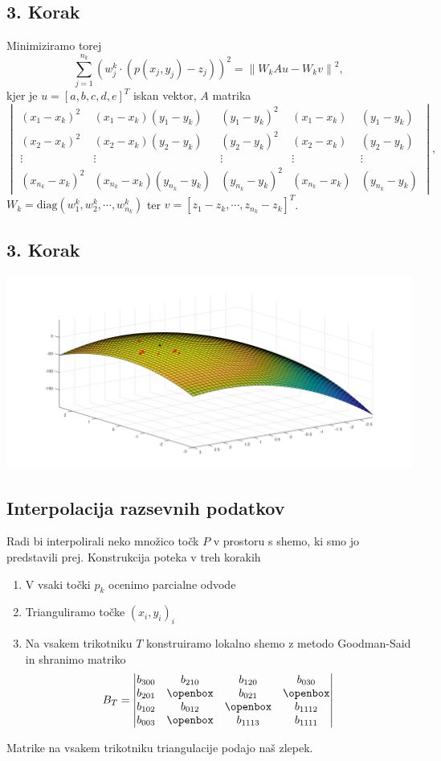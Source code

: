 \documentclass[ignorenonframetext]{beamer}
\newcommand{\norm}[1]{\left\lVert#1\right\rVert}
\let\frametitle\subsection %
\begin{document}
\begin{frame}
\frametitle{3. Korak}
Minimiziramo torej
$$\sum_{j =1}^{n_k} (w^k_j \cdot (p(x_j,y_j) - z_j))^2 = \norm{W_kAu - W_kv}^2,$$
kjer je $u = [a,b,c,d,e]^T$ iskan vektor, $A$ matrika
\begin{equation*}
\begin{vmatrix}
(x_1 - x_k)^2 &  (x_1 - x_k) (y_1 - y_k) & (y_1 - y_k)^2 & (x_1 - x_k) & (y_1 - y_k) \\
(x_2 - x_k)^2 &  (x_2 - x_k) (y_2 - y_k) & (y_2 - y_k)^2 & (x_2 - x_k) & (y_2 - y_k) \\
\vdots & \vdots & \vdots & \vdots & \vdots \\
(x_{n_k} - x_k)^2 & (x_{n_k} - x_k) (y_{n_k} - y_k) & (y_{n_k} - y_k)^2 & (x_{n_k} - x_k) & (y_{n_k} - y_k)
\end{vmatrix},
\end{equation*}
$W_k = \text{diag}(w^k_1, w^k_2, \cdots, w^k_{n_k})$ ter $v = [z_1 - z_k, \cdots, z_{n_k} - z_k]^T$.
\end{frame}

\begin{frame}
\frametitle{3. Korak}
\includegraphics[width=\textwidth, height=\textheight]{slike/surfInterpol.png}
\end{frame}

\begin{frame}
\frametitle{Interpolacija razsevnih podatkov}
Radi bi interpolirali neko množico točk $P$ v prostoru s shemo, ki smo jo predstavili prej.
Konstrukcija poteka v treh korakih
\begin{enumerate}
\item V vsaki točki $p_k$ ocenimo parcialne odvode
\item Trianguliramo točke $(x_i,y_i)_i$
\item Na vsakem trikotniku $T$ konstruiramo lokalno shemo z metodo Goodman-Said in shranimo matriko 
\begin{equation*}
B_T = 
\begin{vmatrix}
b_{300} & b_{210} & b_{120} & b_{030} \\
b_{201} & \openbox & b_{021} & \openbox  \\
b_{102} & b_{012} & \openbox & b_{1112} \\
b_{003} & \openbox & b_{1113} & b_{1111}
\end{vmatrix}
\end{equation*}
\end{enumerate}
Matrike na vsakem trikotniku triangulacije podajo naš zlepek.

\end{frame}
\end{document}
